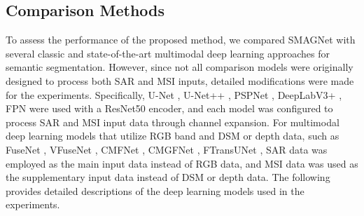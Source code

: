 \documentclass[preprint,12pt,authoryear]{elsarticle}
\begin{document}
\subsection{Comparison Methods}
\label{Section4.4}

To assess the performance of the proposed method, we compared SMAGNet with several classic and state-of-the-art multimodal deep learning approaches for semantic segmentation. However, since not all comparison models were originally designed to process both SAR and MSI inputs, detailed modifications were made for the experiments. Specifically, U-Net \citep{ronneberger2015u}, U-Net++ \citep{zhou2019unetplusplus}, PSPNet \citep{zhao2017pyramid}, DeepLabV3+ \citep{chen2018encoder}, FPN \citep{lin2017feature} were used with a ResNet50 encoder, and each model was configured to process SAR and MSI input data through channel expansion. For multimodal deep learning models that utilize RGB band and DSM or depth data, such as FuseNet \citep{hazirbas2017fusenet}, VFuseNet \citep{audebert2018beyond}, CMFNet \citep{ma2022crossmodal}, CMGFNet \citep{hosseinpour2022cmgfnet}, FTransUNet \citep{ma2024multilevel}, SAR data was employed as the main input data instead of RGB data, and MSI data was used as the supplementary input data instead of DSM or depth data. The following provides detailed descriptions of the deep learning models used in the experiments. 
\end{document}
